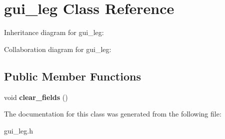 \hypertarget{classgui__leg}{}\section{gui\+\_\+leg Class Reference}
\label{classgui__leg}


Inheritance diagram for gui\+\_\+leg\+:


Collaboration diagram for gui\+\_\+leg\+:
\subsection*{Public Member Functions}
\begin{DoxyCompactItemize}
\item 
void {\bfseries clear\+\_\+fields} ()\hypertarget{classgui__leg_a4e5a273526ed9783c7c7aaa1b33acc19}{}\label{classgui__leg_a4e5a273526ed9783c7c7aaa1b33acc19}

\end{DoxyCompactItemize}


The documentation for this class was generated from the following file\+:\begin{DoxyCompactItemize}
\item 
gui\+\_\+leg.\+h\end{DoxyCompactItemize}
